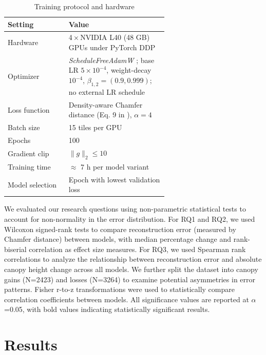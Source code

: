 \documentclass[preprints,article,accept,pdftex,moreauthors]{Definitions/mdpi}
\begin{document}
\begin{table}[htbp]
  \centering
  \caption{Training protocol and hardware}
  \label{tab:training_protocol}
  \begin{tabular}{lp{0.62\linewidth}}
    \toprule
    \textbf{Setting} & \textbf{Value} \\
    \midrule
    Hardware      & 4\,×\,NVIDIA L40 (48 GB) GPUs under PyTorch DDP \\
    Optimizer     & \textit{ScheduleFreeAdamW} \cite{defazio_road_2024}; base LR $5\times10^{-4}$, weight-decay $10^{-4}$, $\beta_{1,2}=(0.9,0.999)$; no external LR schedule \\
    Loss function & Density-aware Chamfer distance (Eq. 9 in \cite{wu_density-aware_2021}), $\alpha=4$ \\
    Batch size    & 15 tiles per GPU \\
    Epochs        & 100 \\
    Gradient clip & $\lVert g\rVert_2 \le 10$ \\
    Training time & $\approx$ 7 h per model variant \\
    Model selection & Epoch with lowest validation loss \\
    \bottomrule
  \end{tabular}
\end{table}

We evaluated our research questions using non-parametric statistical tests to account for non-normality in the error distribution. For RQ1 and RQ2, we used Wilcoxon signed-rank tests to compare reconstruction error (measured by Chamfer distance) between models, with median percentage change and rank-biserial correlation as effect size measures. For RQ3, we used Spearman rank correlations to analyze the relationship between reconstruction error and absolute canopy height change across all models. We further split the dataset into canopy gains (N=2423) and losses (N=3264) to examine potential asymmetries in error patterns. Fisher r-to-z transformations were used to statistically compare correlation coefficients between models. All significance values are reported at $\alpha$=0.05, with bold values indicating statistically significant results.

\section{Results}
\end{document}
